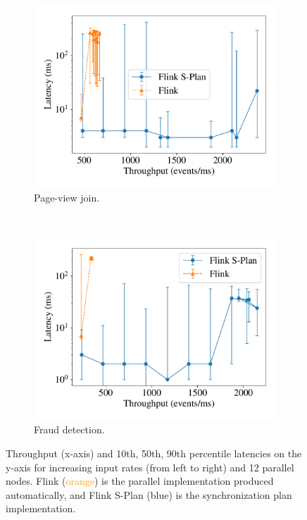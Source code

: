\begin{figure}[t]
    \centering
    \begin{subfigure}[b]{0.48\columnwidth}
      \centering
      \includegraphics[width=\textwidth]{figures/dgs/pageview-flink-splan.pdf}
      \caption{Page-view join.}
      \label{dgs:fig:synchronization-plan-page-view-join-throughput}
    \end{subfigure}
    ~
    \begin{subfigure}[b]{0.48\columnwidth}
      \centering
      \includegraphics[width=\textwidth]{figures/dgs/frauds-flink-splan.pdf}
      \caption{Fraud detection.}
      \label{dgs:fig:synchronization-plan-fraud-detection-throughput}
    \end{subfigure}
    \caption[Flink S-Plan throughput experiment.]{
      Throughput (x-axis) and 10th, 50th, 90th percentile latencies on the y-axis for increasing input rates (from left to right) and 12 parallel nodes. Flink (\textcolor{Orange}{orange}) is the parallel implementation produced automatically, and Flink S-Plan (\textcolor{NavyBlue}{blue}) is the synchronization plan implementation.
      }
    \label{dgs:fig:synchronization-plan-throughputs-flink}
\end{figure}

